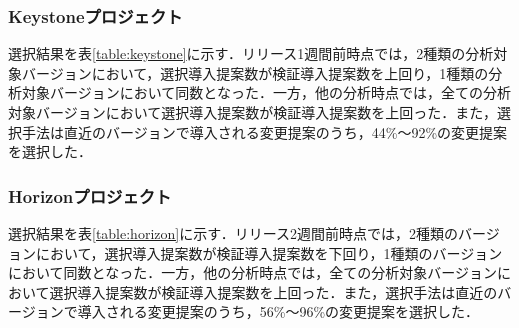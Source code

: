 \documentclass[submit,ses,noauthor]{ipsj}
\begin{document}
\begin{table}[t]
  \caption{Novaプロジェクトにおける選択結果}
  \label{table:nova}
\end{table}

\subsubsection{Keystoneプロジェクト}\label{chap:keystone}
選択結果を表\ref{table:keystone}に示す．リリース1週間前時点では，2種類の分析対象バージョンにおいて，選択導入提案数が検証導入提案数を上回り，1種類の分析対象バージョンにおいて同数となった．一方，他の分析時点では，全ての分析対象バージョンにおいて選択導入提案数が検証導入提案数を上回った．また，選択手法は直近のバージョンで導入される変更提案のうち，44\%〜92\%の変更提案を選択した．


\subsubsection{Horizonプロジェクト}\label{chap:horizon}
選択結果を表\ref{table:horizon}に示す．リリース2週間前時点では，2種類のバージョンにおいて，選択導入提案数が検証導入提案数を下回り，1種類のバージョンにおいて同数となった．一方，他の分析時点では，全ての分析対象バージョンにおいて選択導入提案数が検証導入提案数を上回った．また，選択手法は直近のバージョンで導入される変更提案のうち，56\%〜96\%の変更提案を選択した．
\end{document}
